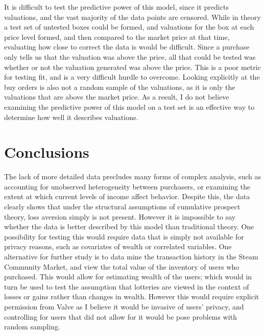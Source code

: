 \documentclass[12pt, letterpaper]{paper}
\begin{document}
It is difficult to test the predictive power of this model, since it
predicts valuations, and the vast majority of the data points are
censored. While in theory a test set of untested boxes could be
formed, and valuations for the box at each price level formed, and
then compared to the market price at that time, evaluating how close
to correct the data is would be difficult. Since a purchase only tells
us that the valuation was above the price, all that could be tested
was whether or not the valuation generated was above the price. This
is a poor metric for testing fit, and is a very difficult hurdle to
overcome. Looking explicitly at the buy orders is also not a random
sample of the valuations, as it is only the valuations that are above
the market price. As a result, I do not believe examining the
predictive power of this model on a test set is an effective way to
determine how well it describes valuations.

\section{Conclusions}
\label{sec-6}
The lack of more detailed data precludes many forms of complex
analysis, such as accounting for unobserved heterogeneity between
purchasers, or examining the extent at which current levels of income
affect behavior. Despite this, the data clearly shows that under
the structural assumptions of cumulative prospect theory, loss
aversion simply is not present. However it is impossible to say
whether the data is better described by this model than traditional
theory. One possibility for testing this would require data that is
simply not available for privacy reasons, such as covariates of wealth
or correlated variables. One alternative for further study is to data
mine the transaction history in the Steam Community Market, and view
the total value of the inventory of users who purchased. This would
allow for estimating wealth of the users; which would in turn be used
to test the assumption that lotteries are viewed in the context of
losses or gains rather than changes in wealth. However this would
require explicit permission from Valve as I believe it would be
invasive of users' privacy, and controlling for users that did not
allow for it would be pose problems with random sampling.
\end{document}
